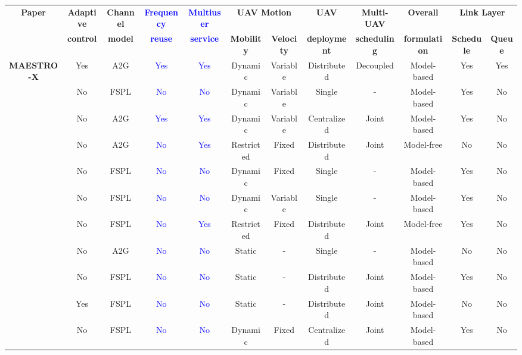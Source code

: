 \documentclass[12pt, draftcls, onecolumn]{IEEEtran}
\theoremstyle{plain}
\theoremstyle{definition}
\theoremstyle{remark}
\newcommand\hlt[1]{\textcolor{blue}{#1}}
\begin{document}
\begin{table}
\begin{center}
\scriptsize
    \begin{tabular}{|*{12}{c|}}
    \hline
    	\multirow{ 2}{*}{{\bf{Paper}}} &
    	{\bf{Adaptive}} &
	\bf{Channel} &
    	\bf{\hlt{Frequency}} &
   	\bf{\hlt{Multiuser}} &
	\multicolumn{2}{c|}{\bf{UAV Motion}} &
    	\bf{UAV} &
    	\bf{Multi-UAV} &
	\bf{Overall} &
	\multicolumn{2}{c|}{\bf{Link Layer}}\\
		&
    	\bf{control} &
	\bf{model} &
    	\bf{\hlt{reuse}} &
   	\bf{\hlt{service}} &
	\bf{Mobility} & \bf{Velocity} &
    	\bf{deployment} &
    	\bf{scheduling} &
	\bf{formulation} &
	\bf{Schedule} & \bf{Queue}\\
    \hline
	{\tiny\bf MAESTRO-X} & Yes & A2G & \hlt{Yes} & \hlt{Yes} & Dynamic & Variable & Distributed & Decoupled & Model-based & Yes & Yes\\
	\hline
    \cite{SCA} & No & FSPL & \hlt{No} & \hlt{No} & Dynamic & Variable & Single & - & Model-based & Yes & No\\
    \hline
    \cite{CSCA-ADMM} & No & A2G & \hlt{Yes} & \hlt{Yes} & Dynamic & Variable & Centralized & Joint & Model-based & Yes & No\\
    \hline
    \cite{DDQN} & No & A2G & \hlt{No} & \hlt{Yes} & Restricted & Fixed & Distributed & Joint & Model-free & No & No\\
    \hline
    \cite{PAoI} & No & FSPL & \hlt{No} & \hlt{No} & Dynamic & Fixed & Single & - & Model-based & Yes & No\\
    \hline
    \cite{MEC-CVX} & No & FSPL & \hlt{No} & \hlt{No} & Dynamic & Variable & Single & - & Model-based & Yes & No\\
    \hline
    \cite{MEC-DDPG} & No & FSPL & \hlt{No} & \hlt{Yes} & Restricted & Fixed & Distributed & Joint & Model-free & Yes & No\\
    \hline
    \cite{LoSMap} & No & A2G & \hlt{No} & \hlt{No} & Static & - & Single & - & Model-based & No & No\\
    \hline
    \cite{GameTheory} & No & FSPL &\hlt{No} & \hlt{No} &  Static & - & Distributed & Joint & Model-based & Yes & No\\
    \hline
    \cite{UAVDynamicCoverage} & Yes & FSPL & \hlt{No} & \hlt{No} & Static & - & Distributed & Joint & Model-based & No & No\\
    \hline
    \cite{JointTrajectoryDesign} & No & FSPL & \hlt{No} & \hlt{No} & Dynamic & Fixed & Centralized & Joint & Model-based & Yes & No\\

\end{tabular}
\end{center}
\end{table}
\end{document}
